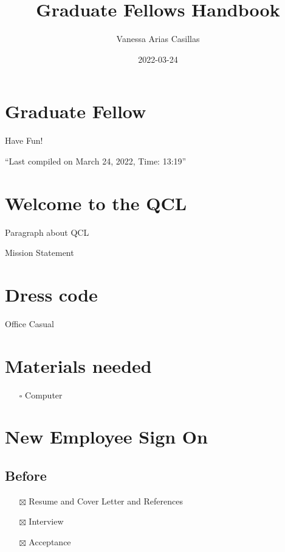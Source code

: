 \documentclass[
]{book}
\title{Graduate Fellows Handbook}
\author{Vanessa Arias Casillas}
\date{2022-03-24}
\providecommand{\tightlist}{%
  \setlength{\itemsep}{0pt}\setlength{\parskip}{0pt}}
\begin{document}
\maketitle

{
\setcounter{tocdepth}{1}
\tableofcontents
}
\hypertarget{graduate-fellow}{%
\chapter{Graduate Fellow}\label{graduate-fellow}}

Have Fun!

``Last compiled on March 24, 2022, Time: 13:19''

\hypertarget{welcome-to-the-qcl}{%
\chapter{Welcome to the QCL}\label{welcome-to-the-qcl}}

Paragraph about QCL

Mission Statement

\hypertarget{dress-code}{%
\chapter{Dress code}\label{dress-code}}

Office Casual

\hypertarget{materials-needed}{%
\chapter{Materials needed}\label{materials-needed}}

\begin{itemize}
\tightlist
\item[$\square$]
  Computer
\end{itemize}

\hypertarget{new-employee-sign-on}{%
\chapter{New Employee Sign On}\label{new-employee-sign-on}}

\hypertarget{before}{%
\section{Before}\label{before}}

\begin{itemize}
\tightlist
\item[$\boxtimes$]
  Resume and Cover Letter and References\\
\item[$\boxtimes$]
  Interview\\
\item[$\boxtimes$]
  Acceptance
\end{itemize}
\end{document}
